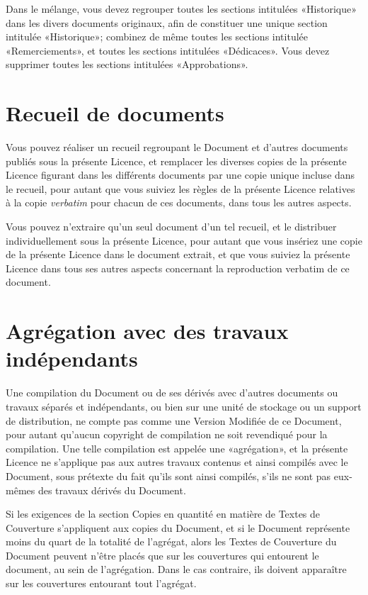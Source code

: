 Dans le mélange, vous devez regrouper toutes les sections
intitulées «Historique» dans les divers documents originaux, afin
de constituer une unique section intitulée «Historique»; combinez
de même toutes les sections intitulée «Remerciements», et toutes les
sections intitulées «Dédicaces». Vous devez supprimer toutes les sections
intitulées «Approbations». 


\section{Recueil de documents} 

Vous pouvez réaliser un recueil regroupant le Document et
d'autres documents publiés sous la présente Licence, et remplacer
les diverses copies de la présente Licence figurant dans les différents
documents par une copie unique incluse dans le recueil, pour autant
que vous suiviez les règles de la présente Licence relatives à la
copie \emph{verbatim} pour chacun de ces documents, dans tous les
autres aspects. 

Vous pouvez n'extraire qu'un seul document d'un tel recueil,
et le distribuer individuellement sous la présente Licence, pour autant
que vous insériez une copie de la présente Licence dans le document
extrait, et que vous suiviez la présente Licence dans tous ses autres
aspects concernant la reproduction verbatim de ce document. 


\section{Agrégation avec des travaux indépendants} 

Une compilation du Document ou de ses dérivés avec d'autres
documents ou travaux séparés et indépendants, ou bien sur une unité
de stockage ou un support de distribution, ne compte pas comme une
Version Modifiée de ce Document, pour autant qu'aucun copyright de
compilation ne soit revendiqué pour la compilation. Une telle compilation
est appelée une «agrégation», et la présente Licence ne s'applique
pas aux autres travaux contenus et ainsi compilés avec le Document,
sous prétexte du fait qu'ils sont ainsi compilés, s'ils ne sont pas
eux-mêmes des travaux dérivés du Document. 

Si les exigences de la section Copies en quantité en matière
de Textes de Couverture s'appliquent aux copies du Document, et si
le Document représente moins du quart de la totalité de l'agrégat,
alors les Textes de Couverture du Document peuvent n'être placés que
sur les couvertures qui entourent le document, au sein de l'agrégation.
Dans le cas contraire, ils doivent apparaître sur les couvertures
entourant tout l'agrégat. 

